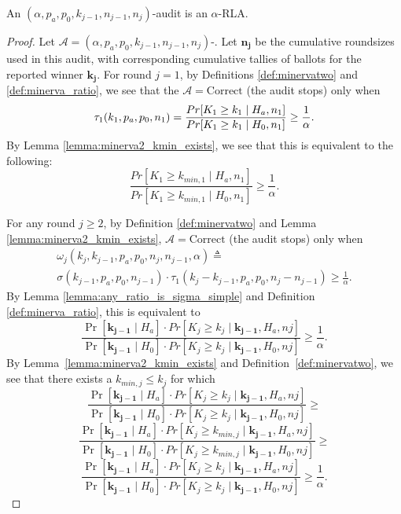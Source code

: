 \begin{theorem}
\label{thm:minerva2_is_rla_new}
An $(\alpha,p_a, p_0,k_{j-1},n_{j-1},n_j)$-\Providence audit is an
$\alpha$-RLA.
\end{theorem}
\begin{proof}
Let $\mathcal{A}=(\alpha,p_a, p_0,k_{j-1},n_{j-1},n_j)$-\Providence.
Let $\bm{n_j}$ be the cumulative roundsizes used in this
audit, with corresponding cumulative tallies of
ballots for the reported winner $\bm{k_j}$.
For round $j=1$, by Definitions \ref{def:minervatwo}
and \ref{def:minerva_ratio}, we see that
the $\mathcal{A}=\text{Correct}$ (the audit stops) only when
$$
\tau_1(k_{1},p_a,p_0,n_1)\\
=\frac{Pr[K_{1} \geq k_{1} \mid H_a, n_1]}{Pr[K_{1} \geq k_{1} \mid H_0, n_1]}
\ge \frac{1}{\alpha}.
$$
By Lemma \ref{lemma:minerva2_kmin_exists}, we see that this
is equivalent to the following:
$$
\frac{Pr[K_{1} \geq k_{min,1} \mid H_a, n_1]}{Pr[K_{1} \geq k_{min, 1} \mid H_0, n_1]}
\ge \frac{1}{\alpha}.
$$

For any round $j\ge 2$, by Definition \ref{def:minervatwo}
and Lemma \ref{lemma:minerva2_kmin_exists},
$\mathcal{A}=\text{Correct}$ (the audit stops) only when
\begin{equation*}
\begin{aligned}
\omega_{j}(k_{j}, k_{j-1}, p_a, p_0, n_{j}, n_{j-1}, \alpha )\triangleq\\
\sigma(k_{j-1},p_a,p_0,n_{j-1})\cdot \tau_1(k_{j}-k_{j-1},p_a,p_0,n_j-n_{j-1})
\ge \frac{1}{\alpha}.
\end{aligned}
\end{equation*}
By Lemma \ref{lemma:any_ratio_is_sigma_simple}
and Definition \ref{def:minerva_ratio}, this is equivalent to
$$
\frac{\Pr[\bm{k_{j-1}} \mid H_a]\cdot Pr[K_{j} \ge k_{j} \mid \bm{k_{j-1}}, H_a, n{j}]}{\Pr[\bm{k_{j-1}} \mid H_0]\cdot Pr[K_{j} \ge k_{j} \mid \bm{k_{j-1}}, H_0, n{j}]}\ge \frac{1}{\alpha}.
$$
By Lemma~\ref{lemma:minerva2_kmin_exists} and Definition~\ref{def:minervatwo},
we see that there exists a $k_{min, j}\le k_j$ for which
$$
\frac{\Pr[\bm{k_{j-1}} \mid H_a]\cdot Pr[K_{j} \ge k_{j} \mid \bm{k_{j-1}}, H_a, n{j}]}{\Pr[\bm{k_{j-1}} \mid H_0]\cdot Pr[K_{j} \ge k_{j} \mid \bm{k_{j-1}}, H_0, n{j}]}\ge
$$
$$
\frac{\Pr[\bm{k_{j-1}} \mid H_a]\cdot Pr[K_{j} \ge k_{min, j} \mid \bm{k_{j-1}}, H_a, n{j}]}{\Pr[\bm{k_{j-1}} \mid H_0]\cdot Pr[K_{j} \ge k_{min, j} \mid \bm{k_{j-1}}, H_0, n{j}]} \ge 
$$
$$
\frac{\Pr[\bm{k_{j-1}} \mid H_a]\cdot Pr[K_{j} \ge k_{j} \mid \bm{k_{j-1}}, H_a, n{j}]}{\Pr[\bm{k_{j-1}} \mid H_0]\cdot Pr[K_{j} \ge k_{j} \mid \bm{k_{j-1}}, H_0, n{j}]}\ge \frac{1}{\alpha}.
$$


\end{proof}
